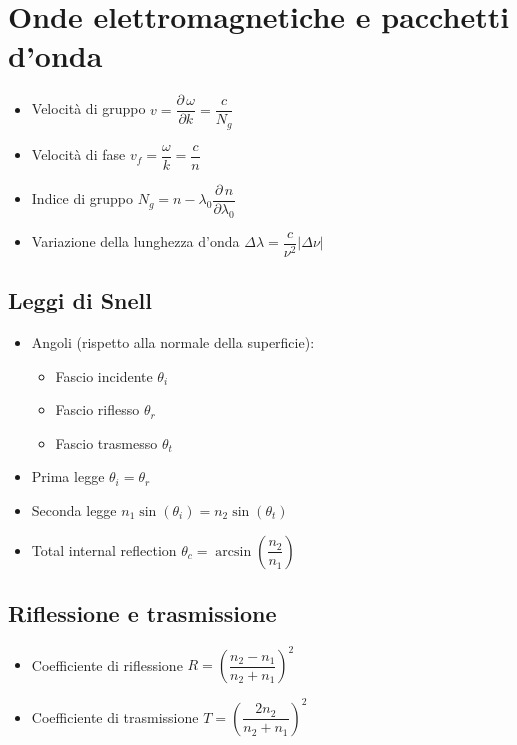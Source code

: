 \documentclass{article}
\begin{document}
\section{Onde elettromagnetiche e pacchetti d'onda}
\begin{itemize}
\item Velocità di gruppo \( v = \dfrac{\partial \, \omega}{\partial k} = \dfrac{c}{N_g} \)
\item Velocità di fase \( v_f = \dfrac{\omega}{k} = \dfrac{c}{n}  \)
\item Indice di gruppo \( N_g = n - \lambda_0 \dfrac{\partial \, n}{\partial \lambda_0} \)
\item Variazione della lunghezza d'onda \( \Delta \lambda = \dfrac{c}{\nu^2} | \Delta \nu | \)
\end {itemize}

\subsection{Leggi di Snell}
\begin{itemize}
  \item Angoli (rispetto alla normale della superficie):
        \begin{itemize}
          \item Fascio incidente \( \theta_i \)
          \item Fascio riflesso  \( \theta_r \)
          \item Fascio trasmesso \( \theta_t \)
        \end{itemize}
  \item Prima legge \( \theta_i = \theta_r \)
  \item Seconda legge \( n_1 \sin(\theta_i) = n_2 \sin(\theta_t) \)
  \item Total internal reflection \( \theta_c = \arcsin \left( \dfrac{n_2}{n_1} \right) \)
\end{itemize}

\subsection{Riflessione e trasmissione}
\begin{itemize}
  \item Coefficiente di riflessione \( R = \left( \dfrac{n_2 - n_1}{n_2 + n_1} \right) ^ 2 \)
  \item Coefficiente di trasmissione \( T = \left( \dfrac{2 n_2}{n_2 + n_1} \right) ^ 2 \)
\end{itemize}
\end{document}
